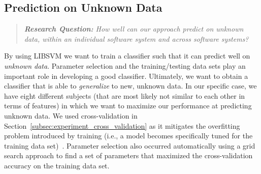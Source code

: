 \subsection{Prediction on Unknown Data}
\label{subsec:experiment_prediction}
\begin{quote}
	\emph{\textbf{Research Question:} How well can our approach predict on unknown data, within an individual software system and across software systems?}
\end{quote}

\noindent
By using LIBSVM we want to train a classifier such that it can predict well on \emph{unknown data}. Parameter selection and the training/testing data sets play an important role in developing a good classifier. Ultimately, we want to obtain a classifier that is able to \emph{generalize} to new, unknown data. In our specific case, we have eight different subjects (that are most likely not similar to each other in terms of features) in which we want to maximize our performance at predicting unknown data. We used cross-validation in Section~\ref{subsec:experiment_cross_validation} as it mitigates the overfitting problem introduced by training (i.e., a model becomes specifically tuned for the training data set)~\cite{HCL03}. Parameter selection also occurred automatically using a grid search approach to find a set of parameters that maximized the cross-validation accuracy on the training data set.

